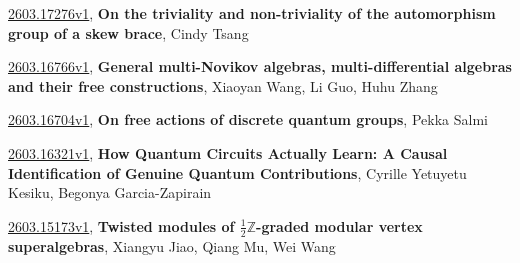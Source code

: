 \documentclass[9pt, a4paper]{article}
\theoremstyle{plain}
\theoremstyle{definition}
\theoremstyle{remark}
\newcommand{\arxiv}[3]{\href{https://arxiv.org/abs/#1}{#1}, \textbf{\textcolor{arxivblue}{#2}}, #3}
\begin{document}
\arxiv{2603.17276v1}{On the triviality and non-triviality of the automorphism group of a skew brace}{Cindy Tsang}

\arxiv{2603.16766v1}{General multi-Novikov algebras, multi-differential algebras and their free constructions}{Xiaoyan Wang, Li Guo, Huhu Zhang}

\arxiv{2603.16704v1}{On free actions of discrete quantum groups}{Pekka Salmi}

\arxiv{2603.16321v1}{How Quantum Circuits Actually Learn: A Causal Identification of Genuine Quantum Contributions}{Cyrille Yetuyetu Kesiku, Begonya Garcia-Zapirain}

\arxiv{2603.15173v1}{Twisted modules of $\frac{1}{2}\mathbb{Z}$-graded modular vertex superalgebras}{Xiangyu Jiao, Qiang Mu, Wei Wang}

\end{document}
